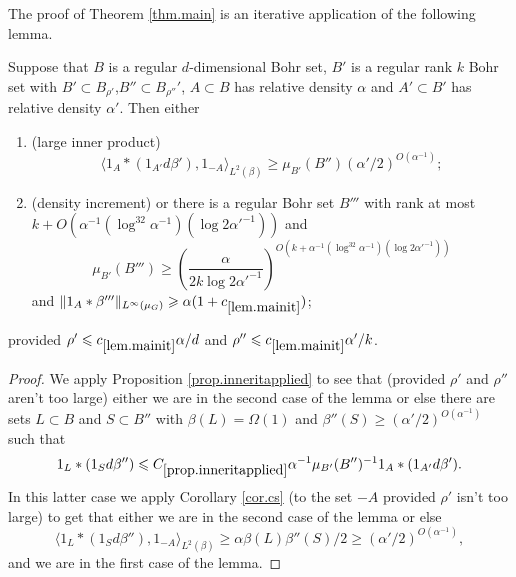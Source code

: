 \documentclass[12pt]{amsart}  %
\begin{document}
The proof of Theorem \ref{thm.main} is an iterative application of the following lemma.
\begin{lemma}\label{lem.mainit}
Suppose that $B$ is a regular $d$-dimensional Bohr set, $B'$ is a regular rank $k$ Bohr set with $B' \subset B_{\rho'}$,$B''\subset B_{\rho''}'$, $A \subset B$ has relative density $\alpha$ and $A' \subset B'$ has relative density $\alpha'$. Then either
\begin{enumerate}
\item (large inner product)
\begin{equation*}
\langle 1_A \ast (1_{A'}d\beta'),1_{-A}\rangle_{L^2(\beta)}\geq \mu_{B'}(B'')(\alpha'/2)^{O(\alpha^{-1})};
\end{equation*}
\item (density increment) or there is a regular Bohr set $B'''$ with rank at most $k + O(\alpha^{-1}(\log^32\alpha^{-1})(\log2\alpha'^{-1}))$ and
\begin{equation*}
\mu_{B'}(B''') \geq \left(\frac{\alpha}{2k\log 2\alpha'^{-1}}\right)^{O(k+\alpha^{-1}(\log^32\alpha^{-1})(\log2\alpha'^{-1}))}
\end{equation*}
and $\|1_A \ast \beta'''\|_{L^\infty(\mu_G)} \geq \alpha(1+c_{\ref{lem.mainit}})$;
\end{enumerate}
provided $\rho' \leq c_{\ref{lem.mainit}}\alpha/d$ and $\rho'' \leq c_{\ref{lem.mainit}}\alpha'/k$.
\end{lemma}
\begin{proof}
We apply Proposition \ref{prop.inneritapplied} to see that (provided $\rho'$ and $\rho''$ aren't too large) either we are in the second case of the lemma or else there are sets $L\subset B$ and $S\subset B''$ with $\beta(L) =\Omega(1)$ and $\beta''(S) \geq (\alpha'/2)^{O(\alpha^{-1})}$ such that
\begin{equation*}
1_L \ast (1_Sd\beta'') \leq C_{\ref{prop.inneritapplied}}\alpha^{-1}\mu_{B'}(B'')^{-1} 1_A \ast (1_{A'}d\beta').
\end{equation*}
In this latter case we apply Corollary \ref{cor.cs} (to the set $-A$ provided $\rho'$ isn't too large) to get that either we are in the second case of the lemma or else
\begin{equation*}
\langle 1_L \ast (1_Sd\beta''),1_{-A} \rangle_{L^2(\beta)} \geq \alpha \beta(L)\beta''(S)/2 \geq (\alpha'/2)^{O(\alpha^{-1})},
\end{equation*}
and we are in the first case of the lemma.
\end{proof}
\end{document}
